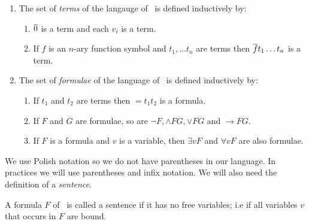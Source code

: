 \documentclass[../main.tex]{subfiles}
\begin{document}
\begin{defi}
	\begin{enumerate}
		\item The set of \textit{terms} of the langauge of \PRA\ is
			defined inductively by:
			\begin{enumerate}
				\item $\overline 0$ is a term and each $v_i$ is a
					term.
				\item If $f$ is an $n$-ary function symbol and
					$t_1,\ldots t_n$ are terms then $\overline
					f t_1\ldots t_n$ is a term.
			\end{enumerate}
		\item The set of \textit{formulae} of the language of  \PRA\ is
			defined inductively by:
			\begin{enumerate}
				\item If $t_1$ and $t_2$ are terms then 
					$=t_1t_2$ is a formula.
				\item If $F$ and $ G$ are formulae,
					so are
					$\neg F,\wedge F G,\vee F G$
					and $\rightarrow F G$.
				\item If $F$ is a formula and $v$ is a
					variable, then $\exists vF$ and
					$\forall vF$ are also formulae.
			\end{enumerate}
	\end{enumerate}
\end{defi}
We use Polish notation so we do not have parentheses in our language. In
practices we will use parentheses and infix notation. We will also need the
definition of a \textit{sentence}.

\begin{defi}
	A formula $F$ of \PRA\ is called a sentence if it has no free
	variables; i.e if all variables $v$ that occurs in $F$ are bound.
\end{defi}
\end{document}
